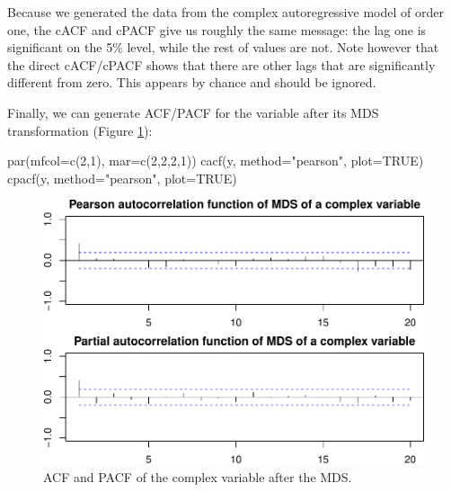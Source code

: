 \documentclass[
]{book}
\newenvironment{Shaded}{\begin{snugshade}}{\end{snugshade}}
\newcommand{\AttributeTok}[1]{\textcolor[rgb]{0.77,0.63,0.00}{#1}}
\newcommand{\ConstantTok}[1]{\textcolor[rgb]{0.00,0.00,0.00}{#1}}
\newcommand{\DecValTok}[1]{\textcolor[rgb]{0.00,0.00,0.81}{#1}}
\newcommand{\FunctionTok}[1]{\textcolor[rgb]{0.00,0.00,0.00}{#1}}
\newcommand{\NormalTok}[1]{#1}
\newcommand{\StringTok}[1]{\textcolor[rgb]{0.31,0.60,0.02}{#1}}
\begin{document}
Because we generated the data from the complex autoregressive model of order one, the cACF and cPACF give us roughly the same message: the lag one is significant on the 5\% level, while the rest of values are not. Note however that the direct cACF/cPACF shows that there are other lags that are significantly different from zero. This appears by chance and should be ignored.

Finally, we can generate ACF/PACF for the variable after its MDS transformation (Figure \ref{fig:complexAR1Pearson}):

\begin{Shaded}
\begin{Highlighting}[]
\FunctionTok{par}\NormalTok{(}\AttributeTok{mfcol=}\FunctionTok{c}\NormalTok{(}\DecValTok{2}\NormalTok{,}\DecValTok{1}\NormalTok{), }\AttributeTok{mar=}\FunctionTok{c}\NormalTok{(}\DecValTok{2}\NormalTok{,}\DecValTok{2}\NormalTok{,}\DecValTok{2}\NormalTok{,}\DecValTok{1}\NormalTok{))}
\FunctionTok{cacf}\NormalTok{(y, }\AttributeTok{method=}\StringTok{"pearson"}\NormalTok{, }\AttributeTok{plot=}\ConstantTok{TRUE}\NormalTok{)}
\FunctionTok{cpacf}\NormalTok{(y, }\AttributeTok{method=}\StringTok{"pearson"}\NormalTok{, }\AttributeTok{plot=}\ConstantTok{TRUE}\NormalTok{)}
\end{Highlighting}
\end{Shaded}

\begin{figure}
\centering
\includegraphics{Svetunkov---Svetunkov---Complex-Valued-Econometrics_files/figure-latex/complexAR1Pearson-1.pdf}
\caption{\label{fig:complexAR1Pearson}ACF and PACF of the complex variable after the MDS.}
\end{figure}
\end{document}
